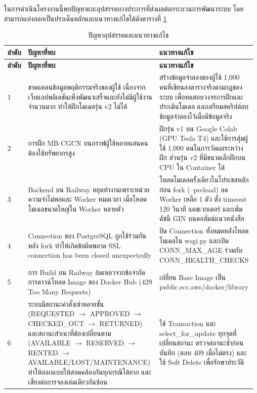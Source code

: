 ในการดำเนินโครงงานนี้พบปัญหาและอุปสรรคบางประการที่ส่งผลต่อกระบวนการพัฒนาระบบ
โดยสามารถแบ่งออกเป็นประเด็นหลักและแนวทางแก้ไขได้ดังตารางที่ \ref{tab:problems}

\begingroup
\small
\begin{longtable}{|p{0.7cm}|p{5.5cm}|p{5.8cm}|}
\caption{ปัญหาอุปสรรคและแนวทางแก้ไข} \label{tab:problems} \\
\hline
\textbf{ลำดับ} & \textbf{ปัญหาที่พบ} & \textbf{แนวทางแก้ไข} \\
\hline
\endfirsthead
\hline
\textbf{ลำดับ} & \textbf{ปัญหาที่พบ} & \textbf{แนวทางแก้ไข} \\
\hline
\endhead
1 & ขาดแคลนข้อมูลพฤติกรรมจริงของผู้ใช้ เนื่องจากเว็บแอปพลิเคชันเพิ่งพัฒนาเสร็จและยังไม่มีผู้ใช้งานจำนวนมาก ทำให้ฝึกโมเดลรุ่น v2 ไม่ได้ &
สร้างข้อมูลจำลองของผู้ใช้ 1,000 คนที่เขียนลงตารางจริงตามกฎของระบบ เพื่อทดสอบวงจรการฝึกและประเมินโมเดล และเตรียมสคริปต์ลบข้อมูลจำลองไว้เมื่อมีข้อมูลจริง \\ \hline
2 & การฝึก MB-CGCN บนกราฟผู้ใช้หลายแสนคนต้องใช้ทรัพยากรสูง  &
ฝึกรุ่น v1 บน Google Colab (GPU Tesla T4) และใช้การสุ่มผู้ใช้ 1,000 คนในการวัดผลระหว่างฝึก ส่วนรุ่น v2 ที่มีขนาดเล็กฝึกบน CPU ใน Container ได้ \\ \hline
3 & Backend บน Railway หยุดทำงานเพราะหน่วยความจำไม่พอและ Worker หมดเวลา เมื่อโหลดโมเดลขนาดใหญ่ใน Worker หลายตัว &
โหลดโมเดลครั้งเดียวในโปรเซสหลักก่อน fork (--preload) ลด Worker เหลือ 1 ตัว ตั้ง timeout 120 วินาที แคชเวกเตอร์ และเพิ่มดัชนี GIN บนคอลัมน์แนวหนังสือ \\ \hline
4 & Connection ของ PostgreSQL ถูกใช้ร่วมกันหลัง fork ทำให้เกิดข้อผิดพลาด SSL connection has been closed unexpectedly &
ปิด Connection ทั้งหมดหลังโหลดโมเดลใน wsgi.py และเปิด CONN\_MAX\_AGE ร่วมกับ CONN\_HEALTH\_CHECKS \\ \hline
5 & การ Build บน Railway ล้มเหลวจากข้อจำกัดการดาวน์โหลด Image ของ Docker Hub (429 Too Many Requests) &
เปลี่ยน Base Image เป็น public.ecr.aws/docker/library \\ \hline
6 & ระบบมีสถานะคำสั่งเช่าหลายขั้น (REQUESTED $\rightarrow$ APPROVED $\rightarrow$ CHECKED\_OUT $\rightarrow$ RETURNED) และสถานะสำเนาที่ต้องเปลี่ยนตาม (AVAILABLE $\rightarrow$ RESERVED $\rightarrow$ RENTED $\rightarrow$ AVAILABLE/LOST/MAINTENANCE) ทำให้ออกแบบให้สอดคล้องกันทุกกรณีได้ยาก และเสี่ยงต่อการจองเล่มเดียวกันซ้อน &
ใช้ Transaction และ select\_for\_update ทุกจุดที่เปลี่ยนสถานะ ตรวจสถานะซ้ำก่อนบันทึก (ตอบ 409 เมื่อไม่ตรง) และใช้ Soft Delete เพื่อรักษาประวัติ \\ \hline
\end{longtable}
\endgroup


